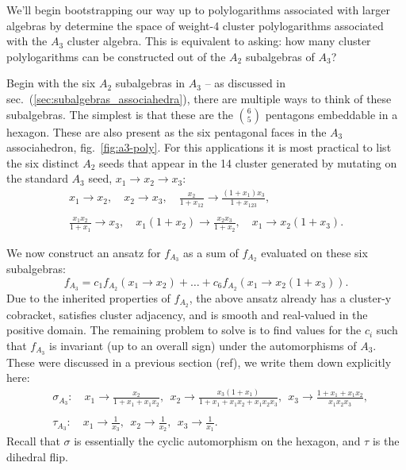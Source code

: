 \documentclass[11pt]{article}
\def\nl{\nonumber\\}
\def\nn{\nonumber}
\begin{document}
We'll begin bootstrapping our way up to polylogarithms associated with larger algebras by determine the space of weight-4 cluster polylogarithms associated with the $A_3$ cluster algebra. This is equivalent to asking: how many cluster polylogarithms can be constructed out of the $A_2$ subalgebras of $A_3$? 

Begin with the six $A_2$ subalgebras in $A_3$ -- as discussed in sec.~(\ref{sec:subalgebras_associahedra}), there are multiple ways to think of these subalgebras. The simplest is that these are the $\binom{6}{5}$ pentagons embeddable in a hexagon. These are also present as the six pentagonal faces in the $A_3$ associahedron, fig.~\ref{fig:a3-poly}. For this applications it is most practical to list the six distinct $A_2$ seeds that appear in the 14 cluster generated by mutating on the standard $A_3$ seed, $x_1 \to x_2 \to x_3$:
\begin{equation}\label{eq:a2-in-a3}
\begin{gathered}
	x_1 \to x_2, \quad 
	x_2 \to x_3, \quad 
	\frac{x_2}{1+x_{12}}\to \frac{\left(1+x_1\right) x_3}{1+x_{123}},\\ \\
	\frac{x_1 x_2}{1+x_1}\to x_3,\quad 
	x_1 \left(1+x_2\right)\to \frac{x_2 x_3}{1+x_2},\quad
	 x_1\to x_2 \left(1+x_3\right).
\end{gathered}	
\end{equation}

We now construct an ansatz for $f_{A_3}$ as a sum of $f_{A_2}$ evaluated on these six subalgebras:
\begin{equation}
	f_{A_3} = c_1 f_{A_2}(x_1 \to x_2) + \ldots + c_6 f_{A_2}(x_1\to x_2 \left(1+x_3\right)). 
\end{equation}	
Due to the inherited properties of $f_{A_2}$, the above ansatz already has a cluster-y cobracket, satisfies cluster adjacency, and is smooth and real-valued in the positive domain. The remaining problem to solve is to find values for the $c_i$ such that $f_{A_3}$ is invariant (up to an overall sign) under the automorphisms of $A_3$. These were discussed in a previous section (ref), we write them down explicitly here:
\begin{align}
	&\sigma_{A_3}:\quad x_1 \to \frac{x_2}{1+x_1 + x_1 x_2}, ~~x_2 \to \frac{x_3(1+x_1)}{1+x_1 + x_1x_2 +x_1x_2x_3},~~ x_3 \to \frac{1+x_1 + x_1 x_2}{x_1x_2x_3},\nl \\
	&\tau_{A_3}:\quad x_1 \to \frac{1}{x_3}, ~~x_2\to\frac{1}{x_2},~~x_3\to \frac{1}{x_1}.\nn
\end{align}
Recall that $\sigma$ is essentially the cyclic automorphism on the hexagon, and $\tau$ is the dihedral flip. 
\end{document}
